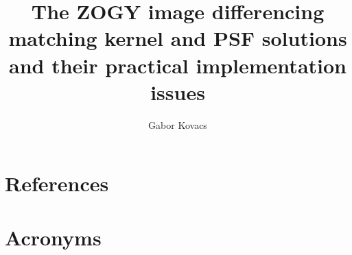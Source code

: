 \documentclass[DM,authoryear,toc]{lsstdoc}
\title{The ZOGY image differencing matching kernel and PSF solutions
  and their practical implementation issues}
\author{%
Gabor Kovacs
}
\date{\vcsDate}
\begin{document}
\maketitle


\appendix

\section{References} \label{sec:bib}
\renewcommand{\refname}{} %


\section{Acronyms} \label{sec:acronyms}

\end{document}
